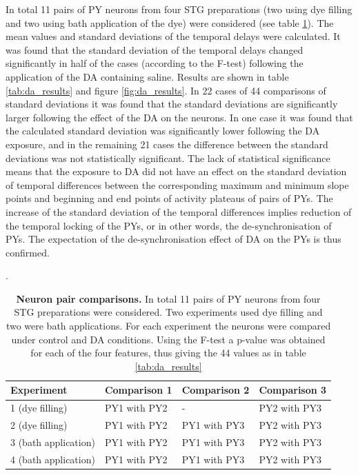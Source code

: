 In total 11 pairs of \ac{PY} neurons from four \ac{STG} preparations (two using dye filling and two using bath application of the dye) were considered (see table \ref{tab:experiments}). The mean values and standard deviations of the temporal delays were calculated. It was found that the standard deviation of the temporal delays changed significantly in half of the cases (according to the F-test) following the application of the \ac{DA} containing saline. Results are shown in table \ref{tab:da_results} and figure \ref{fig:da_results}. In 22 cases of 44 comparisons of standard deviations it was found that the standard deviations are significantly larger following the effect of the \ac{DA} on the neurons. In one case it was found that the calculated standard deviation was significantly lower following the \ac{DA} exposure, and in the remaining 21 cases the difference between the standard deviations was not statistically significant. The lack of statistical significance means that the exposure to \ac{DA} did not have an effect on the standard deviation of temporal differences between the corresponding maximum and minimum slope points and beginning and end points of activity plateaus of pairs of \acp{PY}. The increase of the standard deviation of the temporal differences implies reduction of the temporal locking of the \acp{PY}, or in other words, the de-synchronisation of \acp{PY}. The expectation of the de-synchronisation effect of \ac{DA} on the \acp{PY} is thus confirmed.

\begin{table}
	\small
	\caption[Neuron pair comparisons.]{\textbf{Neuron pair comparisons.} In total 11 pairs of \ac{PY} neurons from four \ac{STG} preparations were considered. Two experiments used dye filling and two were bath applications. For each experiment the neurons were compared under control and \ac{DA} conditions. Using the F-test a p-value was obtained for each of the four features, thus giving the 44 values as in table \ref{tab:da_results}}.
	\label{tab:experiments}
	\begin{tabular}{llll}
		\hline
		\textbf{Experiment} & \textbf{Comparison 1} & \textbf{Comparison 2} & \textbf{Comparison 3} \\ 
		\hline
		1 (dye filling) & PY1 with PY2 & - &PY2 with PY3\\
		2 (dye filling) & PY1 with PY2 & PY1 with PY3 &PY2 with PY3\\
		3 (bath application) & PY1 with PY2 & PY1 with PY3 &PY2 with PY3 \\
		4 (bath application) & PY1 with PY2 & PY1 with PY3 &PY2 with PY3 \\
		
		\hline
	\end{tabular}
\end{table}

